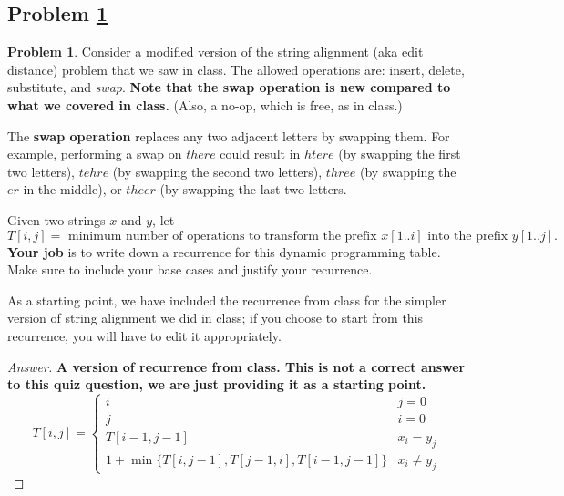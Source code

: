 \documentclass[11pt]{article}
\theoremstyle{definition}
\theoremstyle{definition}
\newtheorem{required}{Problem}
\theoremstyle{definition}
\begin{document}
\subsection{Problem \ref{dp1}}
\begin{required} \label{dp1}
Consider a modified version of the string alignment (aka edit distance) problem that we saw in class. The allowed operations are: insert, delete, substitute, and \emph{swap}. \textbf{Note that the swap operation is new compared to what we covered in class.} (Also, a no-op, which is free, as in class.)

The \textbf{swap operation} replaces any two adjacent letters by swapping them. For example, performing a swap on $there$ could result in $htere$ (by swapping the first two letters), $tehre$ (by swapping the second two letters), $three$ (by swapping the $er$ in the middle), or $theer$ (by swapping the last two letters. 

Given two strings $x$ and $y$, let
\[
T[i,j] = \text{ minimum number of operations to transform the prefix $x[1..i]$ into the prefix $y[1..j]$.}
\]
\textbf{Your job} is to write down a recurrence for this dynamic programming table. Make sure to include your base cases and justify your recurrence.

As a starting point, we have included the recurrence from class for the simpler version of string alignment we did in class; if you choose to start from this recurrence, you will have to edit it appropriately. 

\begin{proof}[Answer]
\textbf{A version of recurrence from class. This is not a correct answer to this quiz question, we are just providing it as a starting point.}
\[
T[i,j] = \begin{cases}
i & j = 0 \\
j & i = 0 \\
T[i-1,j-1] & x_i = y_j \\
1 + \min\{T[i,j-1], T[j-1,i], T[i-1,j-1]\} & x_i \neq y_j
\end{cases}
\]


\end{proof}
\end{required}



\end{document}

